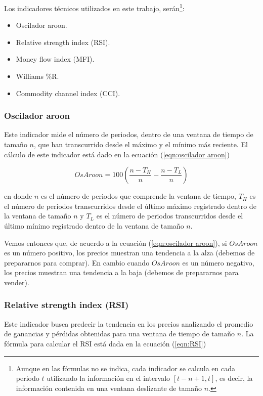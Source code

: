 \documentclass[12pt]{report}
\theoremstyle{break}
\theoremstyle{break}
\begin{document}
Los indicadores técnicos utilizados en este trabajo, serán\footnote{Aunque en las fórmulas no se indica, cada indicador se calcula en cada periodo $t$ utilizando la información en el intervalo $\left[t-n + 1, t\right]$, es decir, la información contenida en una ventana deslizante de tamaño $n$. }:

\begin{itemize}
\item Oscilador aroon.

\item Relative strength index (RSI).

\item Money flow index (MFI).

\item Williams \%R.

\item Commodity channel index (CCI).
\end{itemize}


\subsubsection{Oscilador aroon}
\label{subsubseccion:Oscilador Aroon}
Este indicador mide el número de periodos, dentro de una ventana de tiempo de tamaño $n$, que han transcurrido desde el máximo y el mínimo más reciente. El cálculo de este indicador está dado en la ecuación (\ref{eqn:oscilador aroon})

\begin{equation} \label{eqn:oscilador aroon}
OsAroon = 100 \left( \dfrac{  n - T_H  } { n } - \dfrac{  n - T_L  } { n } \right)
\end{equation}

en donde $n$ es el número de periodos que comprende la ventana de tiempo, $T_H$ es el número de periodos transcurridos desde el último máximo registrado dentro de la ventana de tamaño $n$ y $T_L$ es el número de periodos transcurridos desde el último mínimo registrado dentro de la ventana de tamaño $n$.

Vemos entonces que, de acuerdo a la ecuación (\ref{eqn:oscilador aroon}), si $OsAroon$ es un número positivo, los precios muestran una tendencia a la alza (debemos de prepararnos para comprar). En cambio cuando $OsAroon$ es un número negativo, los precios muestran una tendencia a la baja (debemos de prepararnos para vender).

\subsubsection{Relative strength index (RSI)}
\label{subsubseccion:RSI}
Este indicador busca predecir la tendencia en los precios analizando el promedio de ganancias y pérdidas obtenidas para una ventana de tiempo de tamaño $n$. La fórmula para calcular el RSI está dada en la ecuación (\ref{eqn:RSI})
\end{document}
